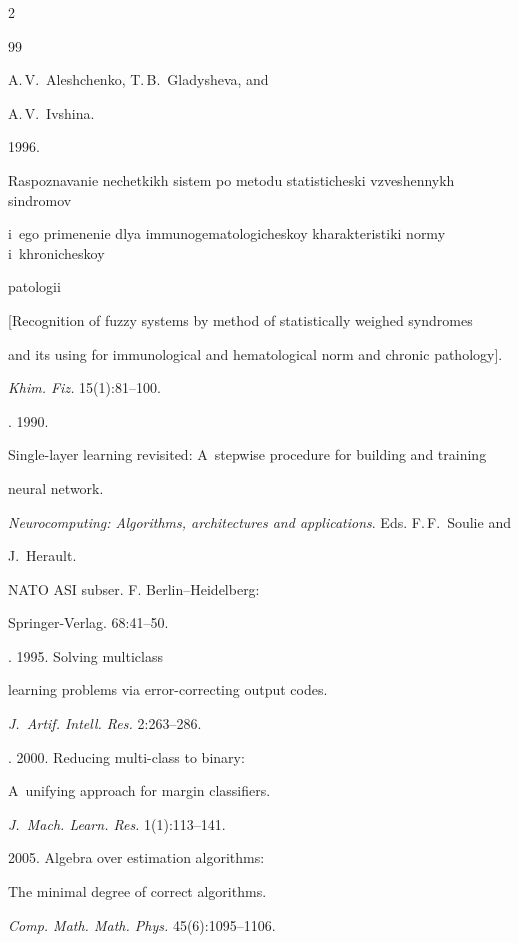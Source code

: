 \begin{multicols}{2}
{{\begin{thebibliography}{99}
{A.\,V.~Aleshchenko, T.\,B.~Gladysheva, and


A.\,V.~Ivshina.} 1996. 


Raspoznavanie nechetkikh sistem po metodu statisticheski vzveshennykh sindromov 


i~ego primenenie dlya immunogematologicheskoy kha\-rak\-te\-ri\-sti\-ki normy i~khronicheskoy 


patologii


[Recognition of fuzzy systems by method of statistically weighed syndromes 


and its using for immunological and hematological norm and chronic pathology].


\textit{Khim. Fiz.} 15(1):81--100.




. 1990. 


Single-layer learning revisited: A~stepwise procedure for building and training 


neural network. 


\textit{Neurocomputing: Algorithms, architectures and applications}. Eds. F.\,F.~Soulie and 


J.~Herault.


NATO ASI subser. F. Berlin--Heidelberg:


    Springer-Verlag. 68:41--50.







. 1995. Solving multiclass 


learning problems via error-correcting output codes. 


\textit{J.~Artif. Intell. Res.} 2:263--286.




. 2000. Reducing multi-class to binary: 


A~unifying approach for margin classifiers. 


\textit{J.~Mach. Learn. Res.} 1(1):113--141.




 2005. Algebra over estimation algorithms: 


The minimal degree of correct algorithms.


\textit{Comp. Math. Math. Phys.} 45(6):1095--1106.



\end{thebibliography}}}
\end{multicols}
